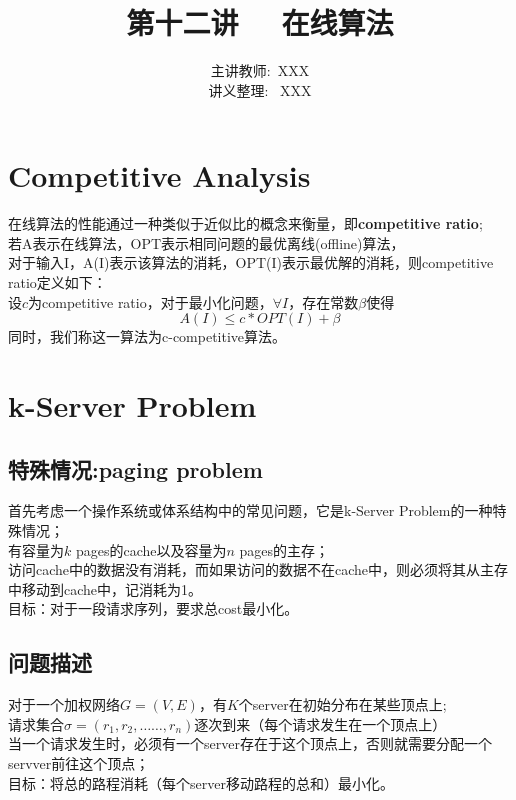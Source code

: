 \documentclass[11pt]{ctexart}
\title{\Huge 第十二讲  \ \ 在线算法}
\author{主讲教师:\  XXX
\\ 讲义整理: \ XXX}
\begin{document}
\maketitle




\section{Competitive Analysis}

在线算法的性能通过一种类似于近似比的概念来衡量，即\textbf{competitive ratio};\\

若A表示在线算法，OPT表示相同问题的最优离线(offline)算法，\\
对于输入I，A(I)表示该算法的消耗，OPT(I)表示最优解的消耗，则competitive ratio定义如下：\\
设$c$为competitive ratio，对于最小化问题，$\forall I$，存在常数$\beta$使得\\
$$A(I) \leq c*OPT(I)+\beta$$
同时，我们称这一算法为c-competitive算法。

\section{ k-Server Problem}

\subsection{特殊情况:paging problem}
首先考虑一个操作系统或体系结构中的常见问题，它是k-Server Problem的一种特殊情况；\\

有容量为$k$ pages的cache以及容量为$n$ pages的主存；\\

访问cache中的数据没有消耗，而如果访问的数据不在cache中，则必须将其从主存中移动到cache中，记消耗为1。\\

目标：对于一段请求序列，要求总cost最小化。\\

\subsection{问题描述}
对于一个加权网络$G=(V,E)$，有$K$个server在初始分布在某些顶点上;\\
请求集合$\sigma=(r_1,r_2,……,r_n)$逐次到来（每个请求发生在一个顶点上）\\
当一个请求发生时，必须有一个server存在于这个顶点上，否则就需要分配一个servver前往这个顶点；\\
目标：将总的路程消耗（每个server移动路程的总和）最小化。\\
\end{document}
